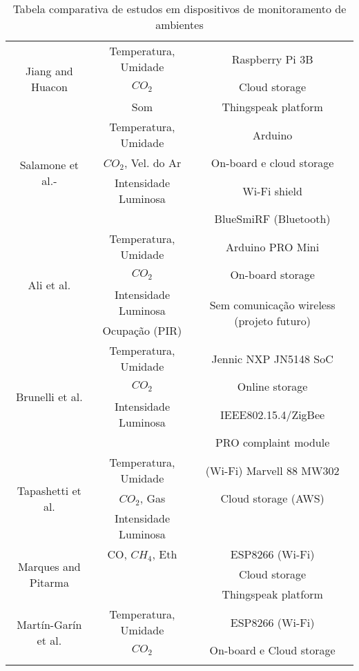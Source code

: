 \documentclass[../monografia.tex]{subfiles}
\begin{document}
\begin{center}
\begin{longtable}{ |c|c|c| }
\hline %
\multirow{3}{8em}{Jiang and Huacon\cite{Jiang2017}} & Temperatura, Umidade & Raspberry Pi 3B \\ 
& $CO_{2}$ & Cloud storage \\ 
& Som & Thingspeak platform \\ 
\hline %
\multirow{4}{8em}{Salamone et al.\cite{SALAMONE2017351}-\cite{Salamone2017}} & Temperatura, Umidade & Arduino \\ 
& $CO_{2}$, Vel. do Ar & On-board e cloud storage \\ 
& Intensidade Luminosa & Wi-Fi shield \\ 
&  & BlueSmiRF (Bluetooth) \\ 
\hline %
\multirow{4}{8em}{Ali et al.\cite{ALI2016114}} & Temperatura, Umidade & Arduino PRO Mini \\
& $CO_{2}$ & On-board storage \\ 
& Intensidade Luminosa & \multirow{2}{12em}{Sem comunicação wireless (projeto futuro)} \\ 
& Ocupação (PIR) &  \\ 
\hline %
\multirow{4}{8em}{Brunelli et al.\cite{Brunelli2014}} & Temperatura, Umidade & Jennic NXP JN5148 %
SoC \\
& $CO_{2}$ & Online storage \\ 
& Intensidade Luminosa & IEEE802.15.4/ZigBee \\ 
&  & PRO complaint module \\ 
\hline %
\multirow{3}{8em}{Tapashetti et al.\cite{Tapashetti2016}} & Temperatura, Umidade & (Wi-Fi) Marvell 88 MW302 \\
& $CO_{2}$, Gas & Cloud storage (AWS) \\ 
& Intensidade Luminosa &  \\ %
\hline %
\multirow{3}{8em}{Marques and Pitarma\cite{Marques2019}} & CO, $CH_{4}$, Eth & ESP8266 (Wi-Fi)\\
&  & Cloud storage \\ 
&  & Thingspeak platform \\ 
\hline %
\multirow{2}{8em}{Martín-Garín et al.\cite{MARTINGARIN2018201}} & Temperatura, Umidade & ESP8266 (Wi-Fi)\\
& $CO_{2}$ & On-board e Cloud storage \\ 
\hline 
\caption{Tabela comparativa de estudos em dispositivos de monitoramento de ambientes}
\label{table}
\end{longtable}
\end{center}
\end{document}
